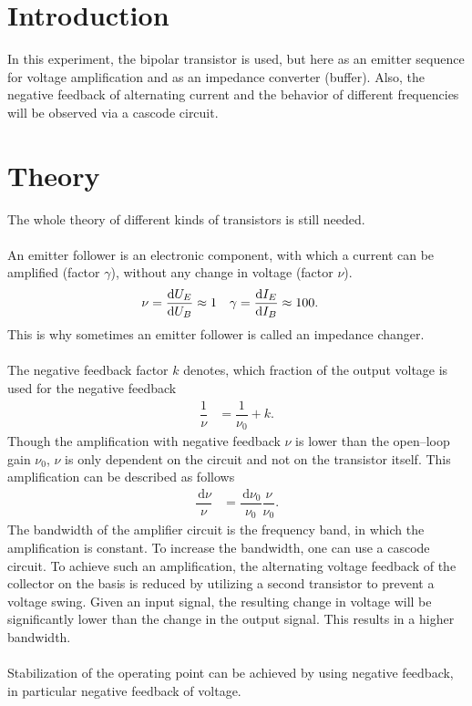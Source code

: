 \documentclass[a4paper,10pt]{article}
\newcommand{\td}{\,\text{d}}
\numberwithin{equation}{section}
\begin{document}
\begin{multicols}{2}
	\sloppy
	\section{Introduction}
	In this experiment, the bipolar transistor is used, but here as an emitter sequence for voltage amplification and as an impedance converter (buffer).
	Also, the negative feedback of alternating current and the behavior of different frequencies will be observed via a cascode circuit.

	\section{Theory}
	The whole theory of different kinds of transistors is still needed.
	\\\\An emitter follower is an electronic component, with which a current can be amplified (factor $\gamma $), without any change in voltage (factor $\nu $).
	\begin{align}
		\nu & = \diff[]{U_E}{U_B}\approx 1 & \gamma & = \diff[]{I_E}{I_B}\approx 100
		.\end{align}
	This is why sometimes an emitter follower is called an impedance changer.
	\\\\ The negative feedback factor $k$ denotes, which fraction of the output voltage is used for the negative feedback
	\begin{align}
		\dfrac{1}{\nu } & = \dfrac{1}{\nu _0}+k
		.\end{align}
	Though the amplification with negative feedback $\nu $ is lower than the open--loop gain $\nu _0$, $\nu $ is only dependent on the circuit and not on the transistor itself.
	This amplification can be described as follows
	\begin{align}
		\dfrac{\td \nu }{\nu } & = \dfrac{\td \nu _0}{\nu _0}\dfrac{\nu }{\nu _0}
		.\end{align}
	The bandwidth of the amplifier circuit is the frequency band, in which the amplification is constant.
	To increase the bandwidth, one can use a cascode circuit.
	To achieve such an amplification, the alternating voltage feedback of the collector on the basis is reduced by utilizing a second transistor to prevent a voltage swing.
	Given an input signal, the resulting change in voltage will be significantly lower than the change in the output signal.
	This results in a higher bandwidth.
	\\\\ Stabilization of the operating point can be achieved by using negative feedback, in particular negative feedback of voltage.

\end{multicols}
\end{document}

